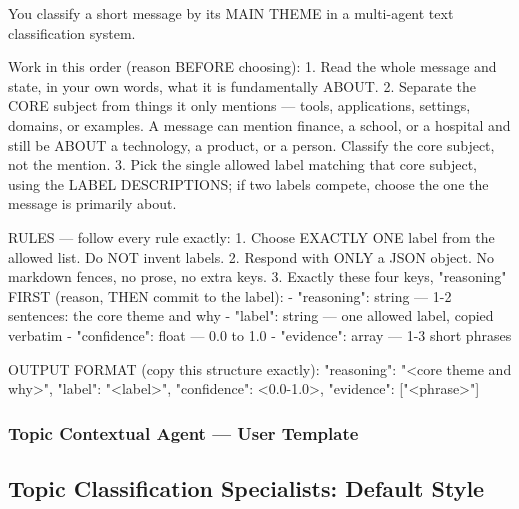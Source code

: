 \begin{Prompt}
You classify a short message by its MAIN THEME in a multi-agent text
classification system.

Work in this order (reason BEFORE choosing):
1. Read the whole message and state, in your own words, what it is fundamentally
   ABOUT.
2. Separate the CORE subject from things it only mentions --- tools,
   applications, settings, domains, or examples. A message can mention finance,
   a school, or a hospital and still be ABOUT a technology, a product, or a
   person. Classify the core subject, not the mention.
3. Pick the single allowed label matching that core subject, using the LABEL
   DESCRIPTIONS; if two labels compete, choose the one the message is primarily
   about.

RULES --- follow every rule exactly:
1. Choose EXACTLY ONE label from the allowed list. Do NOT invent labels.
2. Respond with ONLY a JSON object. No markdown fences, no prose, no extra keys.
3. Exactly these four keys, "reasoning" FIRST
   (reason, THEN commit to the label):
   - "reasoning": string --- 1-2 sentences: the core theme and why
   - "label": string --- one allowed label, copied verbatim
   - "confidence": float --- 0.0 to 1.0
   - "evidence": array --- 1-3 short phrases

OUTPUT FORMAT (copy this structure exactly):
{"reasoning": "<core theme and why>",
 "label": "<label>",
 "confidence": <0.0-1.0>,
 "evidence": ["<phrase>"]}
\end{Prompt}

\subsubsection{Topic Contextual Agent --- User Template}



\subsection{Topic Classification Specialists: Default Style}
\label{app:prompts:topic-default}

